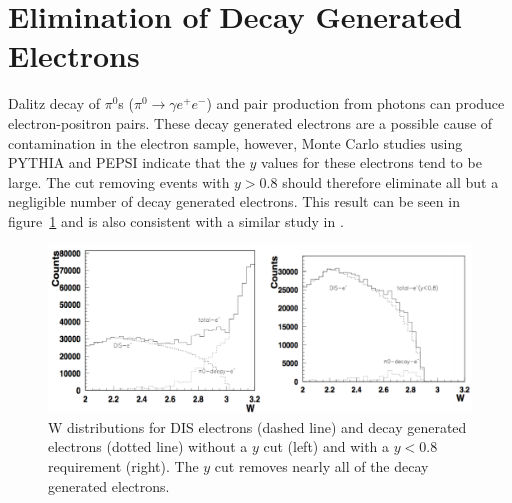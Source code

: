 \section{Elimination of Decay Generated Electrons}
\label{sec:decayGeneratedElectrons}
Dalitz decay of $\pi^0$s ($\pi^0 \rightarrow \gamma e^+ e^-$) and pair production from photons can produce electron-positron pairs.
These decay generated electrons are a possible cause of contamination in the electron sample, however, Monte Carlo studies using PYTHIA and PEPSI indicate that the $y$ values for these electrons tend to be large.
The cut removing events with $y > 0.8$ should therefore eliminate all but a negligible number of decay generated electrons.
This result can be seen in figure~\ref{fig:decayElectronRemoval} and is also consistent with a similar study in \cite{Prok14}.
%
\begin{figure}[htp]
\centering
\includegraphics[width=6in]{figures/decayElectronRemoval.png}
\caption{W distributions for DIS electrons (dashed line) and decay generated electrons (dotted line) without a $y$ cut (left) and with a $y<0.8$ requirement (right). The $y$ cut removes nearly all of the decay generated electrons.}
\label{fig:decayElectronRemoval}
\end{figure}
